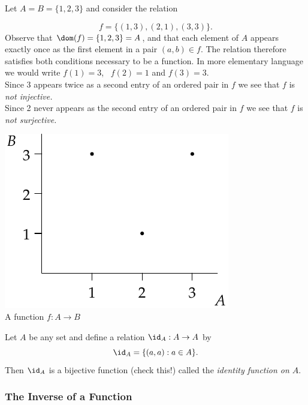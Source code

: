 \begin{example}
Let $A=B=\{1,2,3\}$ and consider the relation\\
\noindent\begin{minipage}{0.62\textwidth}
\[f=\{(1,3),(2,1),(3,3)\}.\]
Observe that $\dom(f)=\{1,2,3\}=A$, and that each element of $A$ appears exactly once as the first element in a pair $(a,b)\in f$. The relation therefore satisfies both conditions necessary to be a function. In more elementary language we would write $f(1)=3$, \ $f(2)=1$ and $f(3)=3$.\\[5pt]
Since 3 appears twice as a second entry of an ordered pair in $f$ we see that $f$ is \emph{not injective.}\\[5pt]
Since 2 never appears as the second entry of an ordered pair in $f$ we see that $f$ is \emph{not surjective.}
\end{minipage}\hfill\begin{minipage}{0.33\textwidth}
\centering
\includegraphics[width=\textwidth]{relations-18-reln1}\\
A function $f:A\to B$
\end{minipage}
\end{example}

\begin{example}
Let $A$ be any set and define a relation $\id_A : A \to A$ by
\[
    \id_A = \{(a,a) : a \in A\}.
\]
Then $\id_A$ is a bijective function (check this!) called the \emph{identity function on $A$}.
\end{example}

\subsubsection*{The Inverse of a Function}

